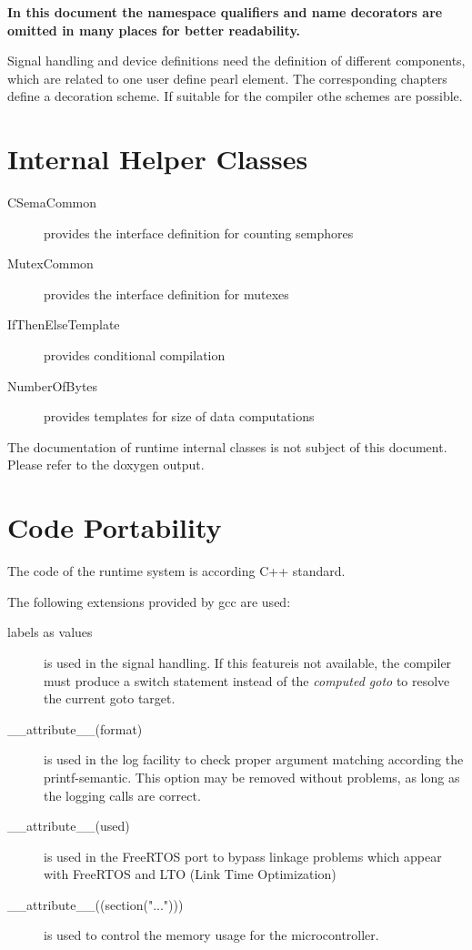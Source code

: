 {\bf 
In this document the namespace qualifiers  and name decorators 
are omitted in many places for better readability.
}

Signal handling and device definitions need the definition of 
different components, which are related to one user define pearl 
element.
The corresponding chapters define a decoration scheme. If suitable
for the compiler othe schemes are possible. 


\section{Internal Helper Classes}
\begin{description}
\item[CSemaCommon]  provides the interface definition for counting semphores
\item[MutexCommon] provides the interface definition for mutexes
\item[IfThenElseTemplate] provides conditional compilation
\item[NumberOfBytes] provides templates for size of data computations
\end{description}
The documentation of runtime internal classes is not subject of this document.
Please refer to the doxygen output.

\section{Code Portability}
The code of the runtime system is according C++ standard.

The following extensions provided by gcc are used:
\begin{description}
\item[labels as values] is used in the signal handling. 
   If this featureis not available, the compiler must produce a switch 
   statement instead of the {\em computed goto} to resolve
   the current goto target.
\item[\_\_attribute\_\_(format)] is used in the log facility to check
   proper argument matching according the printf-semantic.
   This option may be removed without problems, as long as the logging
   calls are correct.
\item[\_\_attribute\_\_(used)] is used in the FreeRTOS port to bypass linkage
   problems which appear with FreeRTOS and LTO (Link Time Optimization)
\item[\_\_attribute\_\_((section("...")))] is used to control the
   memory usage for the microcontroller.
\end{description}
   
